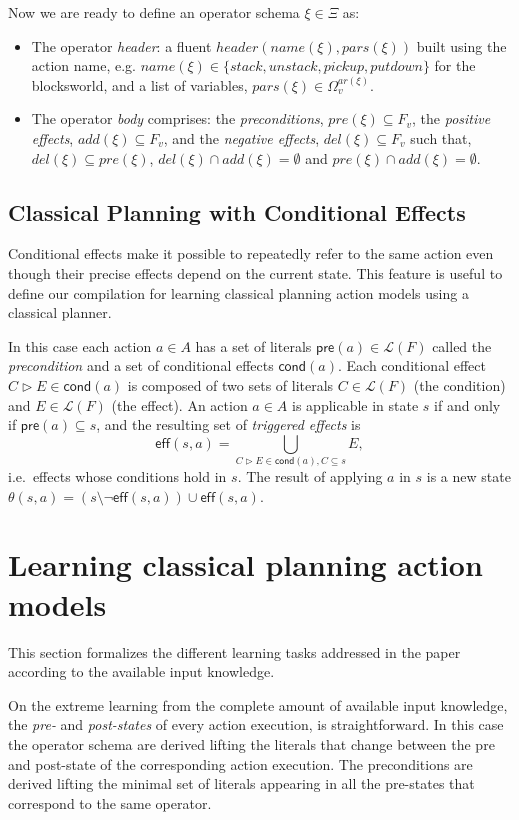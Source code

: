 \documentclass[letterpaper]{article} %
\newcommand{\pre}{\mathsf{pre}}     %
\newcommand{\eff}{\mathsf{eff}}     %
\newcommand{\cond}{\mathsf{cond}}   %
\begin{document}
Now we are ready to define an operator schema $\xi\in \Xi$ as:
\begin{itemize}
\item The operator {\em header}: a fluent $header(name(\xi),pars(\xi))$ built using the action name, e.g. $name(\xi)\in\{stack,unstack,pickup,putdown\}$ for the blocksworld, and a list of variables, $pars(\xi)\in\Omega_v^{ar(\xi)}$. 
\item The operator {\em body} comprises: the {\em preconditions}, $pre(\xi)\subseteq F_v$, the {\em positive effects}, $add(\xi)\subseteq F_v$, and the {\em negative effects}, $del(\xi)\subseteq F_v$ such that, $del(\xi)\subseteq pre(\xi)$, $del(\xi)\cap add(\xi)=\emptyset$ and $pre(\xi)\cap add(\xi)=\emptyset$.
\end{itemize}


\subsection{Classical Planning with Conditional Effects}
Conditional effects make it possible to repeatedly refer to the same action even though their precise effects depend on the current state. This feature is useful to define our compilation for learning classical planning action models using a classical planner.

In this case each action $a\in A$ has a set of literals $\pre(a)\in\mathcal{L}(F)$ called the {\em precondition} and a set of conditional effects $\cond(a)$. Each conditional effect $C\rhd E\in\cond(a)$ is composed of two sets of literals $C\in\mathcal{L}(F)$ (the condition) and $E\in\mathcal{L}(F)$ (the effect). An action $a\in A$ is applicable in state $s$ if and only if $\pre(a)\subseteq s$, and the resulting set of {\em triggered effects} is
\[
\eff(s,a)=\bigcup_{C\rhd E\in\cond(a),C\subseteq s} E,
\]
i.e.~effects whose conditions hold in $s$. The result of applying $a$ in $s$ is a new state $\theta(s,a)=(s\setminus \neg\eff(s,a))\cup\eff(s,a)$.


\section{Learning classical planning action models}
This section formalizes the different learning tasks addressed in the paper according to the available input knowledge.

On the extreme learning from the complete amount of available input knowledge, the {\em pre-} and {\em post-states} of every action execution, is straightforward. In this case the operator schema are derived lifting the literals that change between the pre and post-state of the corresponding action execution. The preconditions are derived lifting the minimal set of literals appearing in all the pre-states that correspond to the same operator.
\end{document}
